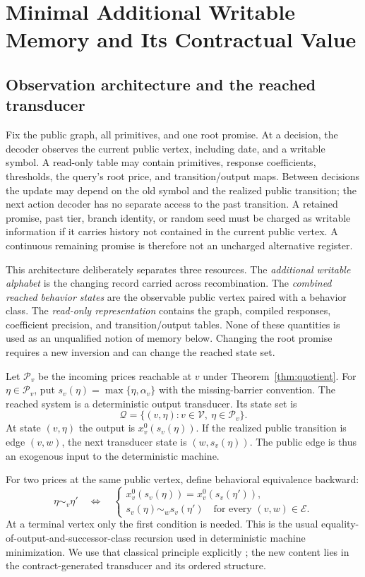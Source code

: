 \section{Minimal Additional Writable Memory and Its Contractual Value}\label{sec:memory}
\subsection{Observation architecture and the reached transducer}
Fix the public graph, all primitives, and one root promise. At a decision, the decoder observes the current public vertex, including date, and a writable symbol. A read-only table may contain primitives, response coefficients, thresholds, the query's root price, and transition/output maps. Between decisions the update may depend on the old symbol and the realized public transition; the next action decoder has no separate access to the past transition. A retained promise, past tier, branch identity, or random seed must be charged as writable information if it carries history not contained in the current public vertex. A continuous remaining promise is therefore not an uncharged alternative register.

This architecture deliberately separates three resources. The \emph{additional writable alphabet} is the changing record carried across recombination. The \emph{combined reached behavior states} are the observable public vertex paired with a behavior class. The \emph{read-only representation} contains the graph, compiled responses, coefficient precision, and transition/output tables. None of these quantities is used as an unqualified notion of memory below. Changing the root promise requires a new inversion and can change the reached state set.

Let $\mathcal P_v$ be the incoming prices reachable at $v$ under Theorem~\ref{thm:quotient}. For $\eta\in\mathcal P_v$, put $s_v(\eta)=\max\{\eta,\alpha_v\}$ with the missing-barrier convention. The reached system is a deterministic output transducer. Its state set is
\[
 \mathcal Q=\{(v,\eta):v\in\mathcal V,\ \eta\in\mathcal P_v\}.
\]
At state $(v,\eta)$ the output is $x_v^0(s_v(\eta))$. If the realized public transition is edge $(v,w)$, the next transducer state is $(w,s_v(\eta))$. The public edge is thus an exogenous input to the deterministic machine.

For two prices at the same public vertex, define behavioral equivalence backward:
\begin{equation}\label{eq:behavior}
 \eta\sim_v\eta'\quad\Longleftrightarrow\quad
 \begin{cases}
 x_v^0(s_v(\eta))=x_v^0(s_v(\eta')),\\
 s_v(\eta)\sim_w s_v(\eta')\quad\text{for every }(v,w)\in\mathcal E.
 \end{cases}
\end{equation}
At a terminal vertex only the first condition is needed. This is the usual equality-of-output-and-successor-class recursion used in deterministic machine minimization. We use that classical principle explicitly \citep{BeanBirgeSmith1987,GivanDeanGreig2003,Peyriere2023}; the new content lies in the contract-generated transducer and its ordered structure.


